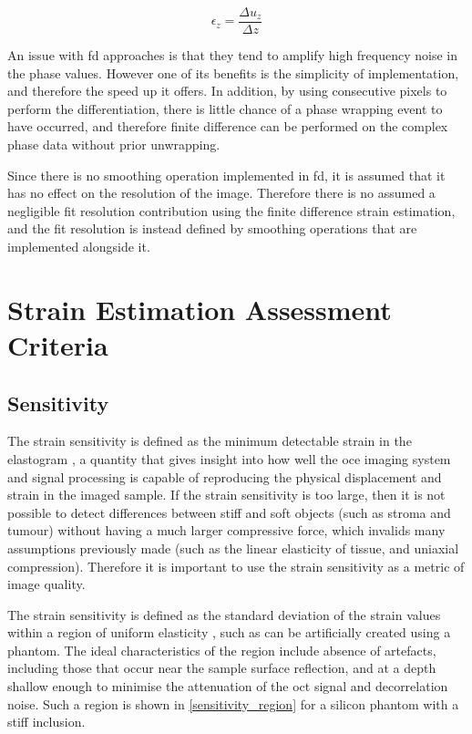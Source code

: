 \begin{equation}
	\label{fd_strain}
	\epsilon_z = \frac{\Delta u_z}{\Delta z}
\end{equation}

An issue with \ac{fd} approaches is that they tend to amplify high frequency noise in the phase values. However one of its benefits is the simplicity of implementation, and therefore the speed up it offers. In addition, by using consecutive pixels to perform the differentiation, there is little chance of a phase wrapping event to have occurred, and therefore finite difference can be performed on the complex phase data without prior unwrapping.

Since there is no smoothing operation implemented in \ac{fd}, it is assumed that it has no effect on the resolution of the image. Therefore there is no assumed a negligible fit resolution contribution using the finite difference strain estimation, and the fit resolution is instead defined by smoothing operations that are implemented alongside it.

\section{Strain Estimation Assessment Criteria}\label{criteria}

\subsection{Sensitivity}
The strain sensitivity is defined as the minimum detectable strain in the elastogram \cite{kennedy_strain_2012}, a quantity that gives insight into how well the \ac{oce} imaging system and signal processing is capable of reproducing the physical displacement and strain in the imaged sample. If the strain sensitivity is too large, then it is not possible to detect differences between stiff and soft objects (such as stroma and tumour) without having a much larger compressive force, which invalids many assumptions previously made (such as the linear elasticity of tissue, and uniaxial compression). Therefore it is important to use the strain sensitivity as a metric of image quality. 

The strain sensitivity is defined as the standard deviation of the strain values within a region of uniform elasticity \cite{varghese_theoretical_1997}, such as can be artificially created using a phantom. The ideal characteristics of the region include absence of artefacts, including those that occur near the sample surface reflection, and at a depth shallow enough to minimise the attenuation of the \ac{oct} signal and decorrelation noise. Such a region is shown in \autoref{sensitivity_region} for a silicon phantom with a stiff inclusion.

